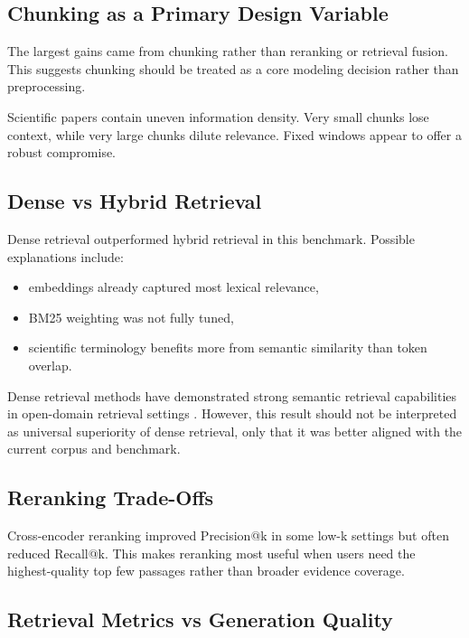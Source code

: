 \documentclass[a4paper,12pt]{article}
\begin{document}
\subsection{Chunking as a Primary Design Variable}

The largest gains came from chunking rather than reranking or retrieval fusion. This suggests chunking should be treated as a core modeling decision rather than preprocessing.

Scientific papers contain uneven information density. Very small chunks lose context, while very large chunks dilute relevance. Fixed windows appear to offer a robust compromise.

\subsection{Dense vs Hybrid Retrieval}

Dense retrieval outperformed hybrid retrieval in this benchmark. Possible explanations include:

\begin{itemize}
    \item embeddings already captured most lexical relevance,
    \item BM25 weighting was not fully tuned,
    \item scientific terminology benefits more from semantic similarity than token overlap.
\end{itemize}

Dense retrieval methods have demonstrated strong semantic retrieval capabilities in open-domain retrieval settings \cite{karpukhin2020dpr}. However, this result should not be interpreted as universal superiority of dense retrieval, only that it was better aligned with the current corpus and benchmark.

\subsection{Reranking Trade-Offs}

Cross-encoder reranking improved Precision@k in some low-k settings but often reduced Recall@k. This makes reranking most useful when users need the highest-quality top few passages rather than broader evidence coverage.

\subsection{Retrieval Metrics vs Generation Quality}
\end{document}

